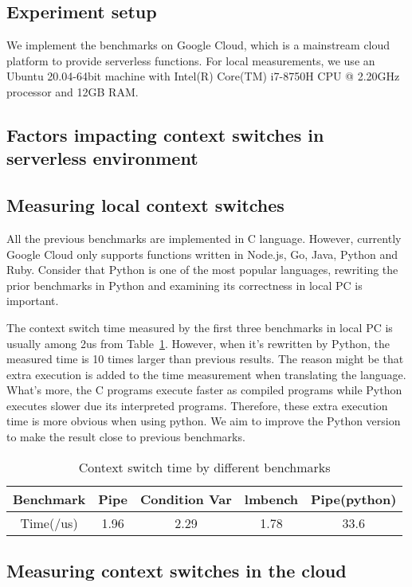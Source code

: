  
\subsection{Experiment setup}

We implement the benchmarks on Google Cloud, which is a mainstream cloud platform to provide serverless functions. 
For local measurements, we use an Ubuntu 20.04-64bit machine with Intel(R) Core(TM) i7-8750H CPU @ 2.20GHz processor and 12GB RAM.


\subsection{Factors impacting context switches in serverless environment}


\subsection{Measuring local context switches}

All the previous benchmarks\cite{cs-web,cs-datasize,cs-lmbench,cs-pipes} are implemented in C language.
However, currently Google Cloud only supports functions written in Node.js, Go, Java, Python and Ruby.
Consider that Python is one of the most popular languages, rewriting the prior benchmarks in Python and examining its correctness in local PC is important.

The context switch time measured by the first three benchmarks in local PC is usually among 2us from Table~\ref{tab:experiment1}.
However, when it's rewritten by Python, the measured time is 10 times larger than previous results. 
The reason might be that extra execution is added to the time measurement when translating the language.
What's more, the C programs execute faster as compiled programs while Python executes slower due its interpreted programs.
Therefore, these extra execution time is more obvious when using python. 
We aim to improve the Python version to make the result close to previous benchmarks.

\begin{center}
    \begin{table}
    \begin{tabular}{||c c c c c||} 
     \hline
     Benchmark & Pipe & Condition Var & lmbench & Pipe(python) \\ 
     \hline
     Time(/us) & 1.96 & 2.29 & 1.78 & 33.6\\ 
     \hline
    \end{tabular}
    \caption{\label{tab:experiment1}Context switch time by different benchmarks}
\end{table}
    
\end{center}

\subsection{Measuring context switches in the cloud}





